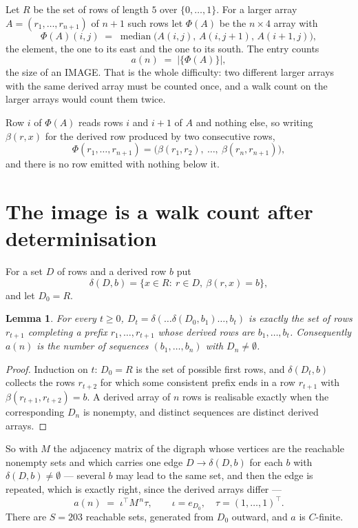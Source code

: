 \documentclass[11pt,a4paper]{article}
\theoremstyle{plain}
\newtheorem{lemma}[theorem]{Lemma}
\theoremstyle{definition}
\begin{document}
Let $R$ be the set of rows of length $5$ over $\{0,\dots,1\}$.
For a larger array $A=(r_1,\dots,r_{n+1})$ of $n+1$ such rows let $\Phi(A)$ be the
$n\times4$ array with
\[
\Phi(A)(i,j)\;=\;\operatorname{median}\bigl(A(i,j),\,A(i,j+1),\,A(i+1,j)\bigr),
\]
the element, the one to its east and the one to its south. The entry counts
\[
a(n)\;=\;\bigl|\{\Phi(A)\}\bigr| ,
\]
the size of an IMAGE. That is the whole difficulty: two different larger arrays with the same
derived array must be counted once, and a walk count on the larger arrays would count them
twice.

Row $i$ of $\Phi(A)$ reads rows $i$ and $i+1$ of $A$ and nothing else, so
writing $\beta(r,x)$ for the derived row produced by two consecutive rows,
\[
\Phi(r_1,\dots,r_{n+1})=\bigl(\beta(r_1,r_2),\ \dots,\ \beta(r_n,r_{n+1})\bigr),
\]
and there is no row emitted with nothing below it.

\section{The image is a walk count after determinisation}

For a set $D$ of rows and a derived row $b$ put
\[
\delta(D,b)=\{x\in R:\ r\in D,\ \beta(r,x)=b\},
\]
and let $D_0=R$.

\begin{lemma}\label{lem:det}
For every $t\ge0$, $D_t=\delta(\dots\delta(D_0,b_1)\dots,b_t)$ is exactly the set of rows
$r_{t+1}$ completing a prefix $r_1,\dots,r_{t+1}$ whose derived rows are $b_1,\dots,b_t$.
Consequently $a(n)$ is the number of sequences $(b_1,\dots,b_n)$ with $D_n\neq\emptyset$.
\end{lemma}

\begin{proof}
Induction on $t$: $D_0=R$ is the set of possible first rows, and $\delta(D_t,b)$ collects the
rows $r_{t+2}$ for which some consistent prefix ends in a row $r_{t+1}$ with
$\beta(r_{t+1},r_{t+2})=b$. A derived array of $n$ rows is realisable exactly when the
corresponding $D_n$ is nonempty, and distinct sequences are distinct derived arrays.
\end{proof}

So with $M$ the adjacency matrix of the digraph whose vertices are the reachable nonempty sets
and which carries one edge $D\to\delta(D,b)$ for each $b$ with $\delta(D,b)\neq\emptyset$ ---
several $b$ may lead to the same set, and then the edge is repeated, which is exactly right,
since the derived arrays differ ---
\[
a(n)\;=\;\iota^{\!\top}M^{\,n}\tau,\qquad \iota=e_{D_0},\quad \tau=(1,\dots,1)^{\!\top} .
\]
There are $S=203$ reachable sets, generated from $D_0$ outward, and $a$ is $C$-finite.
\end{document}
